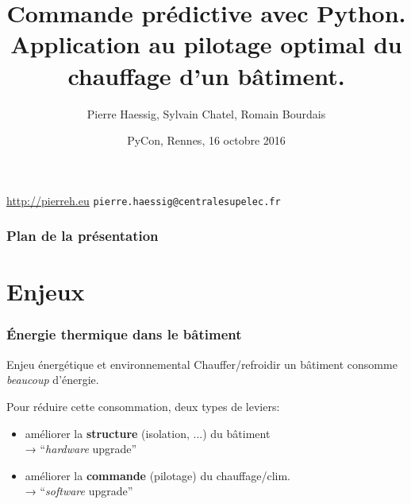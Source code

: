 

\title{Commande prédictive avec Python.\\
Application au pilotage optimal du chauffage d’un bâtiment.}

\author{Pierre Haessig, Sylvain Chatel, Romain Bourdais}
\date{PyCon, Rennes, 16 octobre 2016}



  \begin{frame}

  \titlepage

  \color{gray} \small
   \url{http://pierreh.eu}
   \hfill
   \texttt{pierre.haessig@centralesupelec.fr}

  \end{frame}

 \begin{frame}
   \frametitle{Plan de la présentation}

   \tableofcontents

 \end{frame}

\section{Enjeux}

\begin{frame}
  \frametitle{Énergie thermique dans le bâtiment}

  \begin{block}{Enjeu énergétique et environnemental}
    Chauffer/refroidir un bâtiment consomme \emph{beaucoup} d'énergie. %
  \end{block}



  \bigskip

  Pour réduire cette consommation, deux types de leviers:

  \begin{itemize}
    \item améliorer la \textbf{structure} (isolation, ...) du bâtiment\\
    → ``\emph{hardware} upgrade''
    \pause
    \item améliorer la \textbf{commande} (pilotage) du chauffage/clim.\\
    → ``\emph{software} upgrade''
  \end{itemize}

\end{frame}


